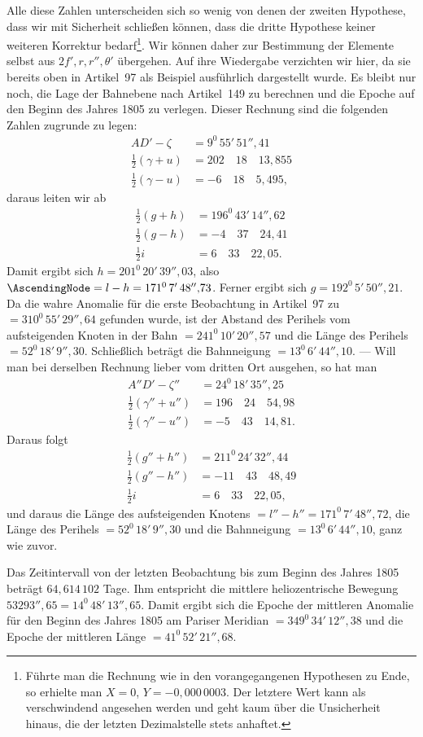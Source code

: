 Alle diese Zahlen unterscheiden sich so wenig von denen der zweiten Hypothese, dass wir mit Sicherheit schließen können, dass die dritte Hypothese keiner weiteren Korrektur bedarf\footnote{Führte man die Rechnung wie in den vorangegangenen Hypothesen zu Ende, so erhielte man $X=0$, $Y=-0{,}000\,0003$. Der letztere Wert kann als verschwindend angesehen werden und geht kaum über die Unsicherheit hinaus, die der letzten Dezimalstelle stets anhaftet.}. Wir können daher zur Bestimmung der Elemente selbst aus $2f',r,r'',\theta'$ übergehen. Auf ihre Wiedergabe verzichten wir hier, da sie bereits oben in Artikel~97 als Beispiel ausführlich dargestellt wurde. Es bleibt nur noch, die Lage der Bahnebene nach Artikel~149 zu berechnen und die Epoche auf den Beginn des Jahres 1805 zu verlegen. Dieser Rechnung sind die folgenden Zahlen zugrunde zu legen:
\[
\begin{aligned}
AD'-\zeta&=9^{0}\,55'\,51''{,}41\\
\tfrac12(\gamma+u)&=202\quad18\quad13{,}855\\
\tfrac12(\gamma-u)&=-6\quad18\quad5{,}495,
\end{aligned}
\]
daraus leiten wir ab
\[
\begin{aligned}
\tfrac12(g+h)&=196^{0}\,43'\,14''{,}62\\
\tfrac12(g-h)&=-4\quad37\quad24{,}41\\
\tfrac12i&=6\quad33\quad22{,}05.
\end{aligned}
\]
Damit ergibt sich $h=201^{0}\,20'\,39''{,}03$, also $\AscendingNode=l-h=171^{0}\,7'\,48''{,}73$. Ferner ergibt sich $g=192^{0}\,5'\,50''{,}21$. Da die wahre Anomalie für die erste Beobachtung in Artikel~97 zu $=310^{0}\,55'\,29''{,}64$ gefunden wurde, ist der Abstand des Perihels vom aufsteigenden Knoten in der Bahn $=241^{0}\,10'\,20''{,}57$ und die Länge des Perihels $=52^{0}\,18'\,9''{,}30$. Schließlich beträgt die Bahnneigung $=13^{0}\,6'\,44''{,}10$. --- Will man bei derselben Rechnung lieber vom dritten Ort ausgehen, so hat man
\[
\begin{aligned}
A''D'-\zeta''&=24^{0}\,18'\,35''{,}25\\
\tfrac12(\gamma''+u'')&=196\quad24\quad54{,}98\\
\tfrac12(\gamma''-u'')&=-5\quad43\quad14{,}81.
\end{aligned}
\]
Daraus folgt
\[
\begin{aligned}
\tfrac12(g''+h'')&=211^{0}\,24'\,32''{,}44\\
\tfrac12(g''-h'')&=-11\quad43\quad48{,}49\\
\tfrac12i&=6\quad33\quad22{,}05,
\end{aligned}
\]
und daraus die Länge des aufsteigenden Knotens $=l''-h''=171^{0}\,7'\,48''{,}72$, die Länge des Perihels $=52^{0}\,18'\,9''{,}30$ und die Bahnneigung $=13^{0}\,6'\,44''{,}10$, ganz wie zuvor.

Das Zeitintervall von der letzten Beobachtung bis zum Beginn des Jahres 1805 beträgt $64{,}614\,102$ Tage. Ihm entspricht die mittlere heliozentrische Bewegung $53293''{,}65=14^{0}\,48'\,13''{,}65$. Damit ergibt sich die Epoche der mittleren Anomalie für den Beginn des Jahres 1805 am Pariser Meridian $=349^{0}\,34'\,12''{,}38$ und die Epoche der mittleren Länge $=41^{0}\,52'\,21''{,}68$.
